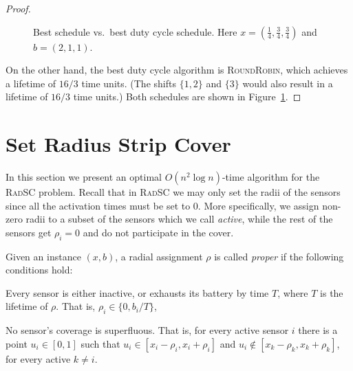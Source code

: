 \documentclass[11pt]{article}
\newcommand{\srsc}{\textsc{RadSC}\xspace}
\newcommand{\rr}{\textsc{RoundRobin}\xspace}
\begin{document}
\begin{proof}
\begin{figure}[t]
{ }
\caption{Best schedule vs.\ best duty cycle schedule. 
Here $x = (\frac{1}{4}, \frac{3}{4}, \frac{3}{4})$ and $b = (2,1,1)$.}
\label{fig:DC}
\end{figure}

On the other hand, the best duty cycle algorithm is \rr, which
achieves a lifetime of $16/3$ time units.  (The shifts $\{1,2\}$ and
$\{3\}$ would also result in a lifetime of $16/3$ time units.)
Both schedules are shown in Figure~\ref{fig:DC}.
\end{proof}




\section{Set Radius Strip Cover}
\label{sec:srsc}

In this section we present an optimal $O(n^2 \log n)$-time algorithm
for the \srsc problem.
Recall that in \srsc we may only set the radii of the sensors since
all the activation times must be set to 0.  More specifically, we
assign non-zero radii to a subset of the sensors which we call \emph{active}, while the rest of
the sensors get $\rho_i=0$ and do not participate in the cover. 


Given an instance $(x,b)$, a radial assignment $\rho$ is called
\emph{proper} if the following conditions hold:
\begin{enumerate*}
\item Every sensor is either inactive, or exhausts its battery by 
      time $T$, where $T$ is the lifetime of $\rho$. That is, $\rho_i
      \in \{0,b_i/T\}$,
\item No sensor's coverage is superfluous. That is, for every active 
      sensor $i$ there is a point $u_i \in [0,1]$ such that $u_i \in
      [x_i-\rho_i,x_i+\rho_i]$ and $u_i \not\in
      [x_k-\rho_k,x_k+\rho_k]$, for every active $k \neq i$.
\end{enumerate*}
\end{document}
